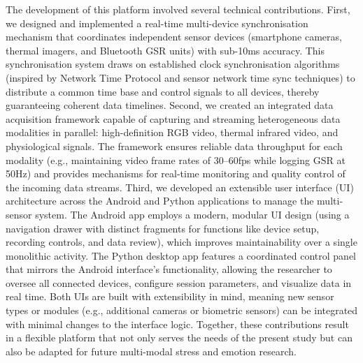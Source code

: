 \documentclass[11pt,a4paper]{report}
\begin{document}
The development of this platform involved several technical contributions. First, we designed and implemented a real-time multi-device synchronisation mechanism that coordinates independent sensor devices (smartphone cameras, thermal imagers, and Bluetooth GSR units) with sub-10ms accuracy. This synchronisation system draws on established clock synchronisation algorithms (inspired by Network Time Protocol and sensor network time sync techniques) to distribute a common time base and control signals to all devices, thereby guaranteeing coherent data timelines. Second, we created an integrated data acquisition framework capable of capturing and streaming heterogeneous data modalities in parallel: high-definition RGB video, thermal infrared video, and physiological signals. The framework ensures reliable data throughput for each modality (e.g., maintaining video frame rates of 30--60fps while logging GSR at 50Hz) and provides mechanisms for real-time monitoring and quality control of the incoming data streams. Third, we developed an extensible user interface (UI) architecture across the Android and Python applications to manage the multi-sensor system. The Android app employs a modern, modular UI design (using a navigation drawer with distinct fragments for functions like device setup, recording controls, and data review), which improves maintainability over a single monolithic activity. The Python desktop app features a coordinated control panel that mirrors the Android interface's functionality, allowing the researcher to oversee all connected devices, configure session parameters, and visualize data in real time. Both UIs are built with extensibility in mind, meaning new sensor types or modules (e.g., additional cameras or biometric sensors) can be integrated with minimal changes to the interface logic. Together, these contributions result in a flexible platform that not only serves the needs of the present study but can also be adapted for future multi-modal stress and emotion research.
\end{document}

